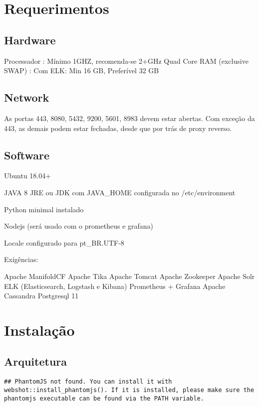 \documentclass[]{book}
\begin{document}
\hypertarget{req}{%
\chapter{Requerimentos}\label{req}}

\hypertarget{hardware}{%
\section{Hardware}\label{hardware}}

Processador : Mínimo 1GHZ, recomenda-se 2+GHz Quad Core
RAM (exclusive SWAP) :
Com ELK: Min 16 GB, Preferível 32 GB

\hypertarget{network}{%
\section{Network}\label{network}}

As portas 443, 8080, 5432, 9200, 5601, 8983 devem estar abertas. Com exceção da 443, as demais podem estar fechadas, desde que por trás de proxy reverso.

\hypertarget{software}{%
\section{Software}\label{software}}

Ubuntu 18.04+

JAVA 8 JRE ou JDK com JAVA\_HOME configurada no /etc/environment

Python minimal instalado

Nodejs (será usado com o prometheus e grafana)

Locale configurado para pt\_BR.UTF-8

Exigências:

Apache ManifoldCF
Apache Tika
Apache Tomcat
Apache Zookeeper
Apache Solr
ELK (Elasticsearch, Logstash e Kibana)
Prometheus + Grafana
Apache Cassandra
Postgresql 11

\hypertarget{instalacao}{%
\chapter{Instalação}\label{instalacao}}

\hypertarget{arquitetura}{%
\section{Arquitetura}\label{arquitetura}}

\begin{verbatim}
## PhantomJS not found. You can install it with webshot::install_phantomjs(). If it is installed, please make sure the phantomjs executable can be found via the PATH variable.
\end{verbatim}
\end{document}
